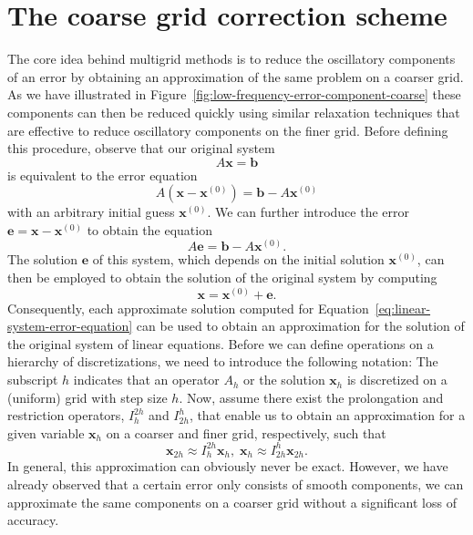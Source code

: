 \section{The coarse grid correction scheme}
The core idea behind multigrid methods is to reduce the oscillatory components of an error by obtaining an approximation of the same problem on a coarser grid.
As we have illustrated in Figure~\ref{fig:low-frequency-error-component-coarse} these components can then be reduced quickly using similar relaxation techniques that are effective to reduce oscillatory components on the finer grid.
Before defining this procedure, observe that our original system
\begin{equation}
	A \bm x = \bm b
\end{equation}
is equivalent to the error equation
\begin{equation}
	A \left(\bm{x} - \bm {x}^{(0)}\right) = \bm{b} - A \bm{x}^{(0)}
\end{equation}
with an arbitrary initial guess $\bm{x}^{(0)}$.
We can further introduce the error $\bm{e} = \bm{x} - \bm {x}^{(0)}$ to obtain the equation
\begin{equation}
	A \bm{e} = \bm{b} - A \bm{x}^{(0)}.
	\label{eq:linear-system-error-equation}
\end{equation}
The solution $\bm{e}$ of this system, which depends on the initial solution $\bm{x}^{(0)}$, can then be employed to obtain the solution of the original system by computing
\begin{equation}
	\bm{x} = \bm{x}^{(0)} + \bm{e}.
\end{equation}
Consequently, each approximate solution computed for Equation~\eqref{eq:linear-system-error-equation} can be used to obtain an approximation for the solution of the original system of linear equations.
Before we can define operations on a hierarchy of discretizations, we need to introduce the following notation:
The subscript $h$ indicates that an operator $A_h$ or the solution $\bm{x}_h$ is discretized on a (uniform) grid with step size $h$.  
Now, assume there exist the prolongation and restriction operators, $I_h^{2h}$ and $I_{2h}^h$, that enable us to obtain an approximation for a given variable $\bm{x}_h$ on a coarser and finer grid, respectively, such that
\begin{equation}
	\bm{x}_{2h} \approx I_h^{2h} \bm{x}_{h}, \;
	\bm{x}_{h} \approx I_{2h}^{h} \bm{x}_{2h}. 
\end{equation}
In general, this approximation can obviously never be exact.
However, we have already observed that a certain error only consists of smooth components, we can approximate the same components on a coarser grid without a significant loss of accuracy.
